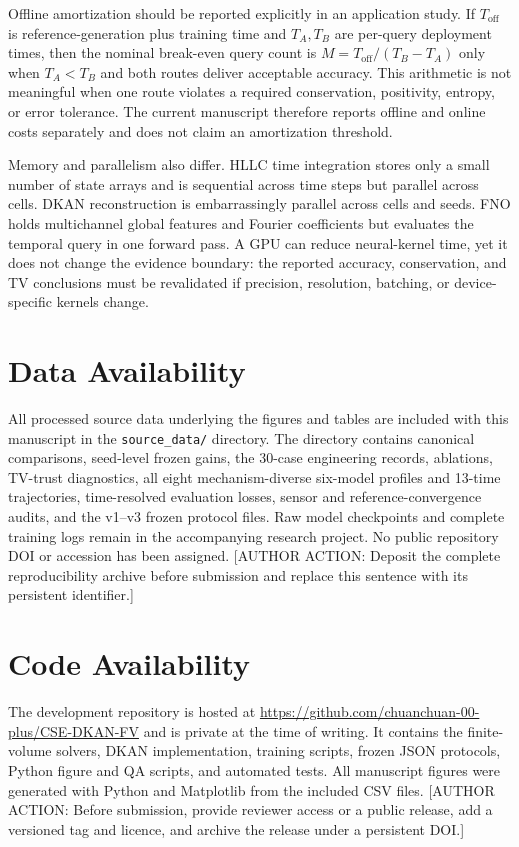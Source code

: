 \documentclass[10pt,twocolumn]{article}
\newcommand{\todoauthor}[1]{\textcolor{red!70!black}{[AUTHOR ACTION: #1]}}
\begin{document}
Offline amortization should be reported explicitly in an application study. If $T_{\mathrm{off}}$ is reference-generation plus training time and $T_A,T_B$ are per-query deployment times, then the nominal break-even query count is $M=T_{\mathrm{off}}/(T_B-T_A)$ only when $T_A<T_B$ and both routes deliver acceptable accuracy. This arithmetic is not meaningful when one route violates a required conservation, positivity, entropy, or error tolerance. The current manuscript therefore reports offline and online costs separately and does not claim an amortization threshold.

Memory and parallelism also differ. HLLC time integration stores only a small number of state arrays and is sequential across time steps but parallel across cells. DKAN reconstruction is embarrassingly parallel across cells and seeds. FNO holds multichannel global features and Fourier coefficients but evaluates the temporal query in one forward pass. A GPU can reduce neural-kernel time, yet it does not change the evidence boundary: the reported accuracy, conservation, and TV conclusions must be revalidated if precision, resolution, batching, or device-specific kernels change.

\FloatBarrier

\section*{Data Availability}

All processed source data underlying the figures and tables are included with this manuscript in the \texttt{source\_data/} directory. The directory contains canonical comparisons, seed-level frozen gains, the 30-case engineering records, ablations, TV-trust diagnostics, all eight mechanism-diverse six-model profiles and 13-time trajectories, time-resolved evaluation losses, sensor and reference-convergence audits, and the v1--v3 frozen protocol files. Raw model checkpoints and complete training logs remain in the accompanying research project. No public repository DOI or accession has been assigned. \todoauthor{Deposit the complete reproducibility archive before submission and replace this sentence with its persistent identifier.}

\section*{Code Availability}

The development repository is hosted at \url{https://github.com/chuanchuan-00-plus/CSE-DKAN-FV} and is private at the time of writing. It contains the finite-volume solvers, DKAN implementation, training scripts, frozen JSON protocols, Python figure and QA scripts, and automated tests. All manuscript figures were generated with Python and Matplotlib from the included CSV files. \todoauthor{Before submission, provide reviewer access or a public release, add a versioned tag and licence, and archive the release under a persistent DOI.}
\end{document}

